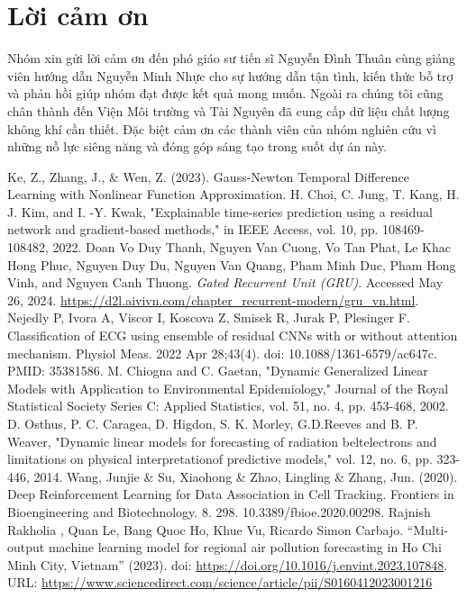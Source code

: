 \documentclass[conference]{IEEEtran}
\begin{document}
\section*{Lời cảm ơn}
Nhóm xin gửi lời cảm ơn đến phó giáo sư tiến sĩ Nguyễn Đình Thuân cùng giảng viên hướng dẫn Nguyễn Minh Nhực cho sự hướng dẫn tận tình, kiến thức bỗ trợ và phản hồi giúp nhóm đạt được kết quả mong muốn. Ngoài ra chúng tôi cũng chân thành đến Viện Môi trường và Tài Nguyên đã cung cấp dữ liệu chất lượng không khí cần thiết. Đặc biệt cảm ơn các thành viên của nhóm nghiên cứu vì những nỗ lực siêng năng và đóng góp sáng tạo trong suốt dự án này.
\begin{thebibliography}{00}
     Ke, Z., Zhang, J., \& Wen, Z. (2023). Gauss-Newton Temporal Difference Learning with Nonlinear Function Approximation.
     H. Choi, C. Jung, T. Kang, H. J. Kim, and I. -Y. Kwak, "Explainable time-series prediction using a residual network and gradient-based methods," in IEEE Access, vol. 10, pp. 108469-108482, 2022.
     Doan Vo Duy Thanh, Nguyen Van Cuong, Vo Tan Phat, Le Khac Hong Phuc, Nguyen Duy Du, Nguyen Van Quang, Pham Minh Duc, Pham Hong Vinh, and Nguyen Canh Thuong. \textit{Gated Recurrent Unit (GRU)}. Accessed May 26, 2024. \url{https://d2l.aivivn.com/chapter_recurrent-modern/gru_vn.html}.
     Nejedly P, Ivora A, Viscor I, Koscova Z, Smisek R, Jurak P, Plesinger F. Classification of ECG using ensemble of residual CNNs with or without attention mechanism. Physiol Meas. 2022 Apr 28;43(4). doi: 10.1088/1361-6579/ac647c. PMID: 35381586.
     M. Chiogna and C. Gaetan, "Dynamic Generalized Linear Models with Application to Environmental Epidemiology," Journal of the Royal Statistical Society Series C: Applied Statistics, vol. 51, no. 4, pp. 453-468, 2002.
     D. Osthus, P. C. Caragea, D. Higdon, S. K. Morley, G.D.Reeves and B. P. Weaver, "Dynamic linear models for forecasting of radiation beltelectrons and limitations on physical interpretationof predictive models," vol. 12, no. 6, pp. 323-446, 2014.
     Wang, Junjie \& Su, Xiaohong \& Zhao, Lingling \& Zhang, Jun. (2020). Deep Reinforcement Learning for Data Association in Cell Tracking. Frontiers in Bioengineering and Biotechnology. 8. 298. 10.3389/fbioe.2020.00298.
     Rajnish Rakholia , Quan Le, Bang Quoc Ho, Khue Vu, Ricardo Simon Carbajo. “Multi-output machine learning model for regional air pollution forecasting in Ho Chi Minh City, Vietnam” (2023). doi: \url{https://doi.org/10.1016/j.envint.2023.107848}. URL: \url{https://www.sciencedirect.com/science/article/pii/S0160412023001216}

\end{thebibliography}
\end{document}

